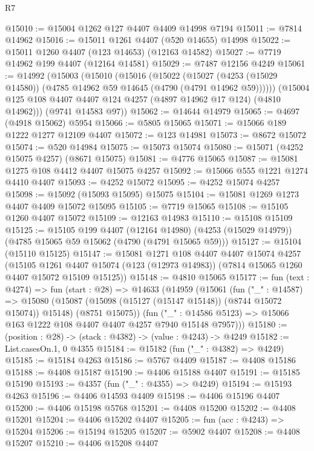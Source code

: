 \begin{lexlean}{R7}
\begin{coremodule}
@15010 := @15004 @1262 @127 @4407 @4409 @14998 @7194
@15011 := @7814 @14962
@15016 := @15011 @1261 @4407 (@520 @14655) @14998
@15022 := @15011 @1260 @4407 (@123 @14653) (@12163 @14582)
@15027 := @7719 @14962 @199 @4407 (@12164 @14581)
@15029 := @7487 @12156 @4249
@15061 := @14992
    (@15003
      (@15010
        (@15016
          (@15022
            (@15027 (@4253 (@15029 @14580)) (@4785 @14962 @59 @14645 (@4790 (@4791 @14962 @59))))))
        (@15004 @125 @108 @4407 @4407 @124 @4257 (@4897 @14962 @17 @124) (@4810 @14962)))
      (@9741 @14583 @97))
@15062 := @14644 @14979
@15065 := @4697 (@4918 @15062) @5954
@15066 := @5805 @15065
@15071 := @15066 @189 @1222 @1277 @12109 @4407
@15072 := @123 @14981
@15073 := @8672 @15072
@15074 := @520 @14984
@15075 := @15073 @15074
@15080 := @15071 (@4252 @15075 @4257) (@8671 @15075)
@15081 := @4776 @15065
@15087 := @15081 @1275 @108 @4412 @4407 @15075 @4257
@15092 := @15066 @555 @1221 @1274 @4410 @4407
@15093 := @4252 @15072
@15095 := @4252 @15074 @4257
@15098 := @15092 (@15093 @15095) @15075
@15104 := @15081 @1269 @1273 @4407 @4409 @15072 @15095
@15105 := @7719 @15065
@15108 := @15105 @1260 @4407 @15072
@15109 := @12163 @14983
@15110 := @15108 @15109
@15125 := @15105
    @199
    @4407
    (@12164 @14980)
    (@4253 (@15029 @14979))
    (@4785 @15065 @59 @15062 (@4790 (@4791 @15065 @59)))
@15127 := @15104 (@15110 @15125)
@15147 := @15081
    @1271
    @108
    @4407
    @4407
    @15074
    @4257
    (@15105
      @1261
      @4407
      @15074
      (@123 (@12973 @14983))
      (@7814 @15065 @1260 @4407 @15072 @15109 @15125))
@15148 := @4810 @15065
@15177 := fun (text : @4274) =>
  fun (start : @28) =>
  @14633
    (@14959
      (@15061
        (fun ("_" : @14587) =>
        @15080
          (@15087 (@15098 (@15127 (@15147 @15148)) (@8744 @15072 @15074)) @15148)
          (@8751 @15075))
        (fun ("_" : @14586 @5123) => @15066 @163 @1222 @108 @4407 @4407 @4257 @7940 @15148 @7957)))
@15180 := (position : @28) -> (stack : @4382) -> (value : @4243) -> @4249
@15182 := List.casesOn.{1, 0} @4355
@15184 := @15182 (fun ("_" : @4382) => @4249)
@15185 := @15184 @4263
@15186 := @5767 @4409
@15187 := @4408 @15186
@15188 := @4408 @15187
@15190 := @4406 @15188 @4407
@15191 := @15185 @15190
@15193 := @4357 (fun ("_" : @4355) => @4249)
@15194 := @15193 @4263
@15196 := @4406 @14593 @4409
@15198 := @4406 @15196 @4407
@15200 := @4406 @15198 @5768
@15201 := @4408 @15200
@15202 := @4408 @15201
@15204 := @4406 @15202 @4407
@15205 := fun (acc : @4243) => @15204
@15206 := @15194 @15205
@15207 := @5902 @4407
@15208 := @4408 @15207
@15210 := @4406 @15208 @4407

\end{coremodule}
\end{lexlean}
